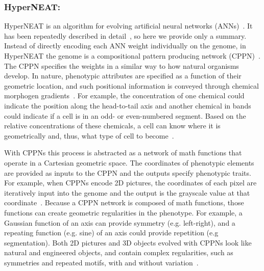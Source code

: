 
\subsubsection{HyperNEAT:}

HyperNEAT is an algorithm for evolving artificial neural networks (ANNs)~\cite{stanley2009hypercube}. It has been repeatedly described in detail~\cite{stanley2009hypercube,gauci2007generating,clune2011performance},  so here we provide only a summary. Instead of directly encoding each ANN weight individually on the genome, in HyperNEAT the genome is a compositional pattern producing network (CPPN)~\cite{stanley2007CPPN}. The CPPN specifies the weights in a similar way to how natural organisms develop. In nature, phenotypic attributes are specified as a function of their geometric location, and such positional information is conveyed through chemical morphogen gradients~\cite{carroll2005endless}. For example, the concentration of one chemical could indicate the position along the head-to-tail axis and another chemical in bands could indicate if a cell is in an odd- or even-numbered segment. Based on the relative concentrations of these chemicals, a cell can know where it is geometrically and, thus, what type of cell to become~\cite{carroll2005endless}. 

With CPPNs this process is abstracted as a network of math functions that operate in a Cartesian geometric space. The coordinates of phenotypic elements are provided as inputs to the CPPN and the outputs specify phenotypic traits. For example, when CPPNs encode 2D pictures, the coordinates of each pixel are iteratively input into the genome and the output is the grayscale value at that coordinate~\cite{secretan2011picbreeder}. Because a CPPN network is composed of math functions, those functions can create geometric regularities in the phenotype. For example, a Gaussian function of an axis can provide symmetry (e.g. left-right), and a repeating function (e.g. sine) of an axis could provide repetition (e.g segmentation). Both 2D pictures and 3D objects evolved with CPPNs look like natural and engineered objects, and contain complex regularities, such as symmetries and repeated motifs, with and without variation~\cite{secretan2011picbreeder,clune2011objects}. 



